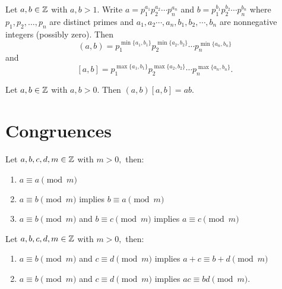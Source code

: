 \documentclass[letterpaper, 11 pt]{ximera}
\begin{document}
\begin{prop*}[Proposition 1.17]\label{prop:form-lcm-gcd}
 Let $a,b\in\mathbb Z$ with $a,b\gt 1.$ Write $a=p_1^{a_1}p_2^{a_2}\cdots  p_n^{a_n}$ and $b=p_1^{b_1}p_2^{b_2}\cdots p_n^{b_n}$ where $p_1,p_2,\dots,p_n$ are distinct primes and ${a_1},{a_2}\cdots,{a_n},{b_1},{b_2},\cdots,{b_n}$ are nonnegative integers (possibly zero). Then
        \[(a,b)=p_1^{\min\{a_1,b_1\}}p_2^{\min\{a_2,b_2\}}\cdots p_n^{\min\{a_n,b_n\}}\]
        and 
        \[[a,b]=p_1^{\max\{a_1,b_1\}}p_2^{\max\{a_2,b_2\}}\cdots p_n^{\max\{a_n,b_n\}}.\]
\end{prop*}

\begin{thm*}[Theorem 1.19]\label{thm:prod-lcm-gcd} Let $a,b\in\mathbb Z$ with $a,b\gt 0.$ Then $(a,b)[a,b]=ab.$
\end{thm*}

\section{Congruences}

\begin{prop*}[Proposition 2.1]\label{prop:equiv-rel}
    Let $a,b,c,d,m\in\mathbb Z$ with $m>0,$ then:
        \begin{enumerate}
            \item\label{equiv-reflect} $a\equiv a \pmod{m}$
            
            \item\label{equiv-sym} $a\equiv b \pmod{m}$ implies $b\equiv a \pmod{m}$

            \item\label{equiv-trans} $a\equiv b \pmod{m}$ and $b\equiv c \pmod{m}$ implies $a\equiv c \pmod{m}$
\end{enumerate}
\end{prop*}


\begin{prop*}[Proposition 2.4]\label{prop:add-mult}
    Let $a,b,c,d,m\in\mathbb Z$ with $m>0,$ then:
    
    \begin{enumerate}[label=(\alph*)]
        \item\label{equiv-add} $a\equiv b \pmod{m}$ and $c\equiv d \pmod{m}$ implies $a+c \equiv b+d \pmod{m}$ 
        \item\label{equiv-multiply} $a\equiv b\pmod{m}$ and $c\equiv d \pmod{m}$ implies $ac\equiv bd \pmod{m}$.
    \end{enumerate}
\end{prop*}
\end{document}
